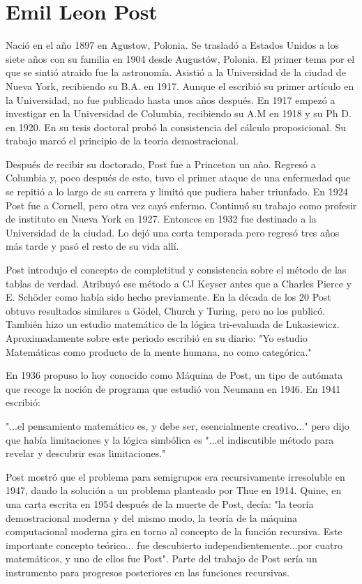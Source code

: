 \documentclass[letterpaper, 11pt]{article}
\begin{document}
\newpage
\section*{Emil Leon Post}

Nació en el año 1897 en Agustow, Polonia. Se trasladó a Estados Unidos a los siete años con su familia en 1904 desde Augustów, Polonia. El primer tema por el que se sintió atraido fue la astronomía. Asistió a la Universidad de la ciudad de Nueva York, recibiendo su B.A. en 1917. Aunque el escribió su primer artículo en la Universidad, no fue publicado hasta unos años después. En 1917 empezó a investigar en la Universidad de Columbia, recibiendo su A.M en 1918 y su Ph D. en 1920. En su tesis doctoral probó la consistencia del cálculo proposicional. Su trabajo marcó el principio de la teoría demostracional.

\noindent Después de recibir su doctorado, Post fue a Princeton un año. Regresó a Columbia y, poco después de esto, tuvo el primer ataque de una enfermedad que se repitió a lo largo de su carrera y limitó que pudiera haber triunfado. En 1924 Post fue a Cornell, pero otra vez cayó enfermo. Continuó su trabajo como profesir de instituto en Nueva York en 1927. Entonces en 1932 fue destinado a la Universidad de la ciudad. Lo dejó una corta temporada pero regresó tres años más tarde y pasó el resto de su vida allí.

\noindent Post introdujo el concepto de completitud y consistencia sobre el método de las tablas de verdad. Atribuyó ese método a CJ Keyser antes que a Charles Pierce y E. Schöder como había sido hecho previamente. En la década de los 20 Post obtuvo resultados similares a Gödel, Church y Turing, pero no los publicó. También hizo un estudio matemático de la lógica tri-evaluada de Lukasiewicz. Aproximadamente sobre este periodo escribió en su diario: "Yo estudio Matemáticas como producto de la mente humana, no como categórica."

\noindent En 1936 propuso lo hoy conocido como Máquina de Post, un tipo de autómata que recoge la noción de programa que estudió von Neumann en 1946. En 1941 escribió:

"...el pensamiento matemático es, y debe ser, esencialmente creativo..." pero dijo que había limitaciones y la lógica simbólica es "...el indiscutible método para revelar y descubrir esas limitaciones."

\noindent Post mostró que el problema para semigrupos era recursivamente irresoluble en 1947, dando la solución a un problema planteado por Thue en 1914. Quine, en una carta escrita en 1954 después de la muerte de Post, decía: "la teoría demostracional moderna y del mismo modo, la teoría de la máquina computacional moderna gira en torno al concepto de la función recursiva. Este importante concepto teórico... fue descubierto independientemente...por cuatro matemáticos, y uno de ellos fue Post". Parte del trabajo de Post sería un instrumento para progresos posteriores en las funciones recursivas.
\end{document}
